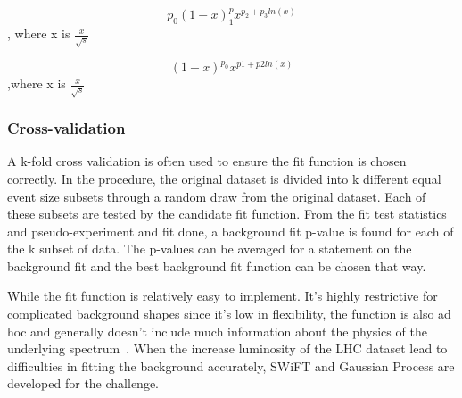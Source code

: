     \begin{equation}
        p_{0}(1-x)^p_{1}x^{p_{2}+p_{3}ln(x)}
        \end{equation}
     , where x is $\frac{x}{\sqrt{s}}$ ~\cite{2009}

    \begin{equation}
        (1-x)^{p_{0}}x^{p1+p2ln(x)}
    \end{equation}
    ,where x is $\frac{x}{\sqrt{s}}$
    ~\cite{2014}

\subsubsection{Cross-validation}
    A k-fold cross validation is often used to ensure the fit function is chosen correctly. In the procedure, the original dataset is divided into k different equal event size subsets through a random draw from the original dataset. Each of these subsets are tested by the candidate fit function. From the fit test statistics and pseudo-experiment and fit done, a background fit p-value is found for each of the k subset of data. The p-values can be averaged for a statement on the background fit and the best background fit function can be chosen that way. 

    While the fit function is relatively easy to implement. It's highly restrictive for complicated background shapes since it's low in flexibility, the function is also ad hoc and generally doesn't include much information about the physics of the underlying spectrum~\cite{ATL-PHYS-PUB-2020-028}. When the increase luminosity of the LHC dataset lead to difficulties in fitting the background accurately, SWiFT and Gaussian Process are developed for the challenge. 

